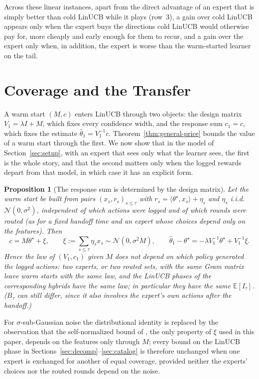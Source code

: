 \documentclass{article}
\newtheorem{proposition}{Proposition}
\theoremstyle{definition}
\theoremstyle{remark}
\newcommand{\E}{\mathbb{E}}
\theoremstyle{remark}
\begin{document}
Across these linear instances, apart from the direct advantage of an expert
that is simply better than cold LinUCB while it plays (row~3), a gain over
cold LinUCB appears only when the expert buys the directions cold LinUCB would
otherwise pay for, more cheaply and early enough for them to recur, and a
gain over the expert only when, in addition, the expert is worse than the
warm-started learner on the tail.

\section{Coverage and the Transfer}
\label{sec:two-channels}

A warm start $(M,c)$ enters LinUCB through two objects: the design matrix
$V_1=\lambda I+M$, which fixes every confidence width, and the response sum
$c_1=c$, which fixes the estimate $\widehat\theta_1=V_1^{-1}c$.
Theorem~\ref{thm:general-price} bounds the value of a warm start through the
first. We now show that in the model of Section~\ref{sec:setup}, with an
expert that sees only what the learner sees, the first is the whole story,
and that the second matters only when the logged rewards depart from that
model, in which case it has an explicit form.

\begin{proposition}[The response sum is determined by the design matrix]
\label{prop:response-sum}
Let the warm start be built from pairs $(x_s,r_s)_{s\le\tau}$ with
$r_s=\langle\theta^\star,x_s\rangle+\eta_s$ and $\eta_s$ i.i.d.\
$\mathcal N(0,\sigma^2)$, independent of which actions were logged and of
which rounds were routed (as for a fixed handoff time and an expert whose
choices depend only on the features). Then
\[
c=M\theta^\star+\xi,\qquad \xi:=\sum_{s\le\tau}\eta_sx_s\sim\mathcal N(0,\sigma^2M),
\qquad
\widehat\theta_1-\theta^\star=-\lambda V_1^{-1}\theta^\star+V_1^{-1}\xi .
\]
Hence the law of $(V_1,c_1)$ given $M$ does not depend on which policy
generated the logged actions: two experts, or two routed sets, with the same
Gram matrix leave warm starts with the same law, and the LinUCB phases of the
corresponding hybrids have the same law; in particular they have the same
$\E[I_\tau]$. ($B_\tau$ can still differ, since it also involves the expert's
own actions after the handoff.)
\end{proposition}

For $\sigma$-sub-Gaussian noise the distributional identity is replaced by the
observation that the self-normalized bound of \cite{abbasi2011improved}, the
only property of $\xi$ used in this paper, depends on the features only
through $M$; every bound on the LinUCB phase in
Sections~\ref{sec:decomp}--\ref{sec:catalog} is therefore unchanged when one
expert is exchanged for another of equal coverage, provided neither the
experts' choices nor the routed rounds depend on the noise.
\end{document}
